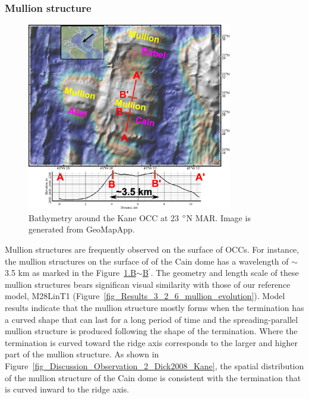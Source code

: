 \subsubsection{Mullion structure}

\begin{figure}[h]
  \centering
    \includegraphics[width=0.8\textwidth]{./Figures/fig_Discussion_Observation_5_Mullion_Kane.eps}
  \caption[Bathymetry around the Kane OCC at 23 $\degree$N MAR.]{Bathymetry around the Kane OCC at 23 $\degree$N MAR. Image is generated from GeoMapApp.}
 \label{fig_Discussion_Observation_5_Mullion_Kane}
\end{figure}   

Mullion structures are frequently observed on the surface of OCCs. For instance, the mullion structures on the surface of of the Cain dome has a wavelength of $\sim$3.5 km as marked in the Figure~\hyperref[fig_Discussion_Observation_5_Mullion_Kane]{\ref{fig_Discussion_Observation_5_Mullion_Kane}.B$\sim$B$^\prime$}. The geometry and length scale of these mullion structures bears significan visual similarity with those of our reference model, M28LinT1 (Figure~\hyperref[fig_Results_3_2_6_mullion_evolution]{\ref{fig_Results_3_2_6_mullion_evolution}}). Model results indicate that the mullion structure mostly forms when the termination has a curved shape that can last for a long period of time and the spreading-parallel mullion structure is produced following the shape of the termination. Where the termination is curved toward the ridge axis corresponds to the larger and higher part of the mullion structure. As shown in Figure~\hyperref[fig_Discussion_Observation_2_Dick2008_Kane]{\ref{fig_Discussion_Observation_2_Dick2008_Kane}}, the spatial distribution of the mullion structure of the Cain dome is consistent with the termination that is curved inward to the ridge axis.

